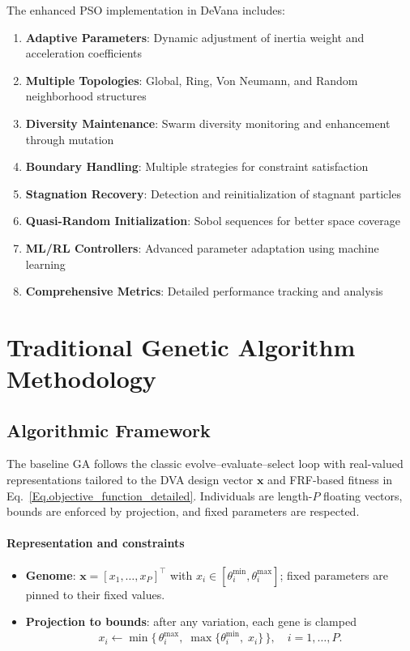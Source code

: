 \documentclass[12pt,a4paper]{article}
\begin{document}
The enhanced PSO implementation in DeVana includes:

\begin{enumerate}
    \item \textbf{Adaptive Parameters}: Dynamic adjustment of inertia weight and acceleration coefficients
    \item \textbf{Multiple Topologies}: Global, Ring, Von Neumann, and Random neighborhood structures
    \item \textbf{Diversity Maintenance}: Swarm diversity monitoring and enhancement through mutation
    \item \textbf{Boundary Handling}: Multiple strategies for constraint satisfaction
    \item \textbf{Stagnation Recovery}: Detection and reinitialization of stagnant particles
    \item \textbf{Quasi-Random Initialization}: Sobol sequences for better space coverage
    \item \textbf{ML/RL Controllers}: Advanced parameter adaptation using machine learning
    \item \textbf{Comprehensive Metrics}: Detailed performance tracking and analysis
\end{enumerate}

\section{Traditional Genetic Algorithm Methodology}

    \subsection{Algorithmic Framework}
    The baseline GA follows the classic evolve–evaluate–select loop with real-valued representations tailored to the DVA design vector $\mathbf{x}$ and FRF-based fitness in Eq.~\eqref{Eq.objective_function_detailed}. Individuals are length-$P$ floating vectors, bounds are enforced by projection, and fixed parameters are respected.

    \paragraph{Representation and constraints}
    \begin{itemize}
        \item \textbf{Genome}: $\mathbf{x}=[x_1,\dots,x_P]^\top$ with $x_i\in[\theta_i^{\min},\theta_i^{\max}]$; fixed parameters are pinned to their fixed values.
        \item \textbf{Projection to bounds}: after any variation, each gene is clamped
        \begin{equation}\label{Eq.bound_projection}
            x_i \leftarrow \min\{\, \theta_i^{\max},\; \max\{\theta_i^{\min},\; x_i\}\,\},\quad i=1,\dots,P.
        \end{equation}
    \end{itemize}
\end{document}
